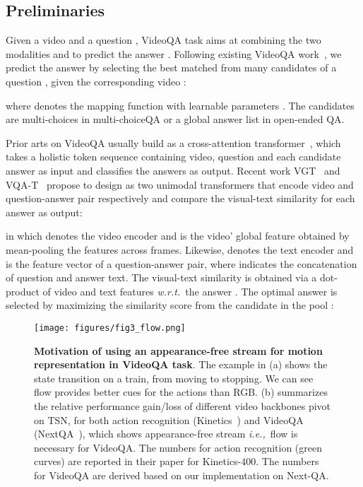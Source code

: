 \documentclass[sigconf]{acmart}
\newcommand{\ie}{\emph{i.e.,~}}
\newcommand{\wrt}{\emph{w.r.t.~}}
\begin{document}
\subsection{Preliminaries}
Given a video  and a question , VideoQA task aims at combining the two modalities  and  to predict the answer . 
Following existing VideoQA work~\cite{li2022invariant, xiao2022hqga, xiao2022vgt}, we predict the answer by selecting the best matched  from many candidates  of a question , given the corresponding video :

where  denotes the mapping function with learnable parameters . The candidates  are multi-choices in multi-choiceQA or a global answer list in open-ended QA. 

Prior arts on VideoQA usually build  as a cross-attention transformer~\cite{zhu2020actbert, lei2021less}, which takes a holistic token sequence containing video, question and each candidate answer as input and classifies the answers as output.
Recent work VGT~\cite{xiao2022vgt} and VQA-T~\cite{Yang_2021_ICCV} propose to design  as two unimodal transformers that encode video and question-answer pair respectively and compare the visual-text similarity for each answer as output:

in which  denotes the video encoder and  is the video' global feature obtained by mean-pooling the features across  frames. Likewise,  denotes the text encoder and  is the feature vector of a question-answer pair, where  indicates the concatenation of question and answer text. 
The visual-text similarity  is obtained via a dot-product of video and text features \wrt the answer . The optimal answer is selected by maximizing the similarity score from the candidate in the pool :


\begin{figure}[t]
    \centering
    \texttt{[image: figures/fig3\_flow.png]}
    \caption{\textbf{Motivation of using an appearance-free stream for motion representation in VideoQA task}. The example in (a) shows the state transition on a train, from moving to stopping. We can see flow provides better cues for the actions than RGB. 
    (b) summarizes the relative performance gain/loss of different video backbones pivot on TSN, for both action recognition (Kinetics~\cite{carreira2017quo}) and VideoQA (NextQA~\cite{xiao2021next}), which shows appearance-free stream \ie flow is necessary for  VideoQA. The numbers for action recognition (green curves) are reported in their paper for Kinetics-400. The numbers for VideoQA are derived based on our implementation on Next-QA.  
    }
    \label{fig:flow}
\end{figure}
\end{document}
